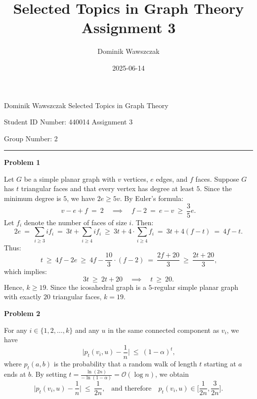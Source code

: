 \documentclass[12pt]{article}
\title{Selected Topics in Graph Theory Assignment 3}
\author{Dominik Wawszczak}
\date{2025-06-14}
\begin{document}
	\setlength{\parindent}{0 cm}
	
	Dominik Wawszczak \hfill Selected Topics in Graph Theory
	
	Student ID Number: 440014 \hfill Assignment 3
	
	Group Number: 2
	
	\bigskip
	\hrule
	\bigskip
	
	\textbf{Problem 1}
	
	\medskip
	
	Let \(G\) be a simple planar graph with \(v\) vertices, \(e\) edges, and
	\(f\) faces. Suppose \(G\) has \(t\) triangular faces and that every vertex
	has degree at least \(5\). Since the minimum degree is \(5\), we have \(2 e
	\geqslant 5 v\). By Euler's formula:
	\[
		v - e + f \ = \ 2 \quad \implies \quad f - 2 \ = \ e - v \ \geqslant \
		\frac{3}{5} e \text{.}
	\]
	Let \(f_{i}\) denote the number of faces of size \(i\). Then:
	\[
		2 e \ = \ \sum\limits_{i \geqslant 3} i f_{i} \ = \ 3 t +
		\sum\limits_{i \geqslant 4} i f_{i} \ \geqslant \ 3 t + 4 \cdot
		\sum\limits_{i \geqslant 4} f_{i} \ = \ 3 t + 4 (f - t) \ = \ 4 f - t
		\text{.}
	\]
	Thus:
	\[
		t \ \geqslant \ 4 f - 2 e \ \geqslant \ 4 f - \frac{10}{3} \cdot (f - 2)
		\ = \ \frac{2 f + 20}{3} \ \geqslant \ \frac{2 t + 20}{3} \text{,}
	\]
	which implies:
	\[
		3 t \ \geqslant \ 2 t + 20 \quad \implies \quad t \ \geqslant \ 20
		\text{.}
	\]
	Hence, \(k \geqslant 19\). Since the icosahedral graph is a \(5\)-regular
	simple planar graph with exactly \(20\) triangular faces, \(k = 19\).
	
	\bigskip
	
	\textbf{Problem 2}
	
	\medskip
	
	For any \(i \in \{1, 2, \ldots, k\}\) and any \(u\) in the same connected
	component as \(v_{i}\), we have
	\[
		\bigg| p_{t}(v_{i}, u) - \frac{1}{n} \bigg| \ \leqslant \
		(1 - \alpha)^{t} \text{,}
	\]
	where \(p_{t}(a, b)\) is the probability that a random walk of length \(t\)
	starting at \(a\) ends at \(b\). By setting \(t =
	\frac{\ln (2 n)}{- \ln (1 - \alpha)} = \mathcal{O}(\log n)\), we obtain
	\[
		\bigg| p_{t}(v_{i}, u) - \frac{1}{n} \bigg| \ \leqslant \ \frac{1}{2 n}
		\text{,} \quad \text{and therefore} \quad p_{t}(v_{i}, u) \in \bigg[
		\frac{1}{2 n}, \frac{3}{2 n} \bigg] \text{.}
	\]
	
	\medskip
	
\end{document}
